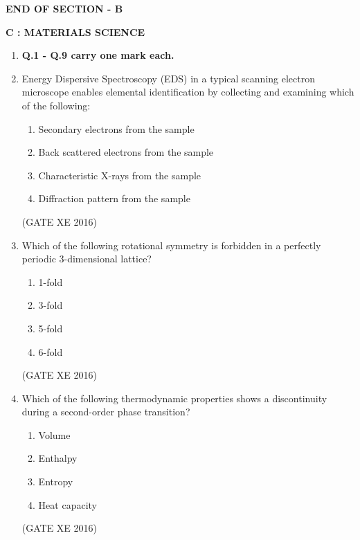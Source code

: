 \documentclass[12pt]{article}
\begin{document}
\begin{center}
    \textbf{END OF SECTION - B}
\end{center}

\newpage

\begin{center}
    {\Large \textbf{C : MATERIALS SCIENCE}}
\end{center}

\begin{enumerate}
\item[] \textbf{Q.1 - Q.9 carry one mark each.}

\item Energy Dispersive Spectroscopy (EDS) in a typical scanning electron microscope enables
elemental identification by collecting and examining which of the following:
\begin{enumerate}
  \item Secondary electrons from the sample
  \item Back scattered electrons from the sample
  \item Characteristic X-rays from the sample
  \item Diffraction pattern from the sample
\end{enumerate}
(GATE XE 2016)

\item Which of the following rotational symmetry is forbidden in a perfectly periodic 3-dimensional lattice?
\begin{multicols}{4}
\begin{enumerate}
  \item 1-fold
  \item 3-fold
  \item 5-fold
  \item 6-fold
\end{enumerate}
\end{multicols}
(GATE XE 2016)

\item Which of the following thermodynamic properties shows a discontinuity during a second-order phase transition?
\begin{multicols}{2}
\begin{enumerate}
  \item Volume
  \item Enthalpy
  \item Entropy
  \item Heat capacity
\end{enumerate}
\end{multicols}
(GATE XE 2016)


\end{enumerate}
\end{document}
